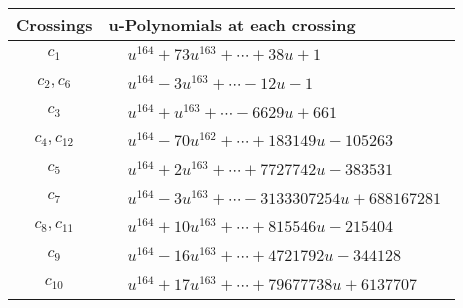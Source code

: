 \documentclass[1p]{elsarticle_modified}
\theoremstyle{definition}
\begin{document}
\begin{tabular}{m{50pt}|m{274pt}}
Crossings & \hspace{64pt}u-Polynomials at each crossing \\
\hline $$\begin{aligned}c_{1}\end{aligned}$$&$\begin{aligned}
&u^{164}+73 u^{163}+\cdots+38 u+1
\end{aligned}$\\
\hline $$\begin{aligned}c_{2},c_{6}\end{aligned}$$&$\begin{aligned}
&u^{164}-3 u^{163}+\cdots-12 u-1
\end{aligned}$\\
\hline $$\begin{aligned}c_{3}\end{aligned}$$&$\begin{aligned}
&u^{164}+u^{163}+\cdots-6629 u+661
\end{aligned}$\\
\hline $$\begin{aligned}c_{4},c_{12}\end{aligned}$$&$\begin{aligned}
&u^{164}-70 u^{162}+\cdots+183149 u-105263
\end{aligned}$\\
\hline $$\begin{aligned}c_{5}\end{aligned}$$&$\begin{aligned}
&u^{164}+2 u^{163}+\cdots+7727742 u-383531
\end{aligned}$\\
\hline $$\begin{aligned}c_{7}\end{aligned}$$&$\begin{aligned}
&u^{164}-3 u^{163}+\cdots-3133307254 u+688167281
\end{aligned}$\\
\hline $$\begin{aligned}c_{8},c_{11}\end{aligned}$$&$\begin{aligned}
&u^{164}+10 u^{163}+\cdots+815546 u-215404
\end{aligned}$\\
\hline $$\begin{aligned}c_{9}\end{aligned}$$&$\begin{aligned}
&u^{164}-16 u^{163}+\cdots+4721792 u-344128
\end{aligned}$\\
\hline $$\begin{aligned}c_{10}\end{aligned}$$&$\begin{aligned}
&u^{164}+17 u^{163}+\cdots+79677738 u+6137707
\end{aligned}$\\
\hline
\end{tabular}\\~\\
\end{document}

